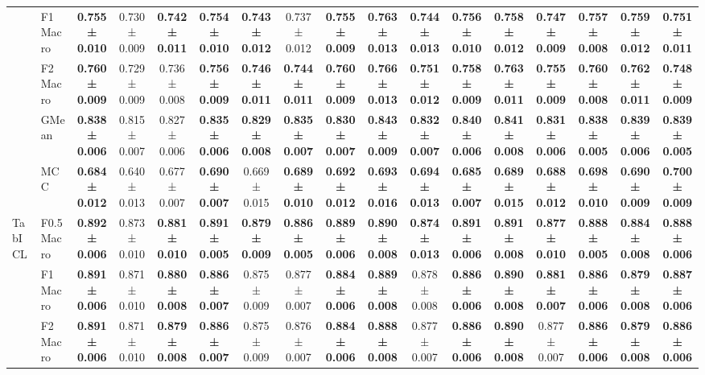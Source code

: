 \begin{table}[H]
{\begin{tabular}{llccccccccccccccc}
 & F1 Macro & \textbf{0.755 ± 0.010} & 0.730 ± 0.009 & \textbf{0.742 ± 0.011} & \textbf{0.754 ± 0.010} & \textbf{0.743 ± 0.012} & 0.737 ± 0.012 & \textbf{0.755 ± 0.009} & \textbf{0.763 ± 0.013} & \textbf{0.744 ± 0.013} & \textbf{0.756 ± 0.010} & \textbf{0.758 ± 0.012} & \textbf{0.747 ± 0.009} & \textbf{0.757 ± 0.008} & \textbf{0.759 ± 0.012} & \textbf{0.751 ± 0.011} \\
 & F2 Macro & \textbf{0.760 ± 0.009} & 0.729 ± 0.009 & 0.736 ± 0.008 & \textbf{0.756 ± 0.009} & \textbf{0.746 ± 0.011} & \textbf{0.744 ± 0.011} & \textbf{0.760 ± 0.009} & \textbf{0.766 ± 0.013} & \textbf{0.751 ± 0.012} & \textbf{0.758 ± 0.009} & \textbf{0.763 ± 0.011} & \textbf{0.755 ± 0.009} & \textbf{0.760 ± 0.008} & \textbf{0.762 ± 0.011} & \textbf{0.748 ± 0.009} \\
 & GMean & \textbf{0.838 ± 0.006} & 0.815 ± 0.007 & 0.827 ± 0.006 & \textbf{0.835 ± 0.006} & \textbf{0.829 ± 0.008} & \textbf{0.835 ± 0.007} & \textbf{0.830 ± 0.007} & \textbf{0.843 ± 0.009} & \textbf{0.832 ± 0.007} & \textbf{0.840 ± 0.006} & \textbf{0.841 ± 0.008} & \textbf{0.831 ± 0.006} & \textbf{0.838 ± 0.005} & \textbf{0.839 ± 0.006} & \textbf{0.839 ± 0.005} \\
 & MCC & \textbf{0.684 ± 0.012} & 0.640 ± 0.013 & 0.677 ± 0.007 & \textbf{0.690 ± 0.007} & 0.669 ± 0.015 & \textbf{0.689 ± 0.010} & \textbf{0.692 ± 0.012} & \textbf{0.693 ± 0.016} & \textbf{0.694 ± 0.013} & \textbf{0.685 ± 0.007} & \textbf{0.689 ± 0.015} & \textbf{0.688 ± 0.012} & \textbf{0.698 ± 0.010} & \textbf{0.690 ± 0.009} & \textbf{0.700 ± 0.009} \\
\cline{1-17}
\multirow[t]{5}{*}{TabICL} & F0.5 Macro & \textbf{0.892 ± 0.006} & 0.873 ± 0.010 & \textbf{0.881 ± 0.010} & \textbf{0.891 ± 0.005} & \textbf{0.879 ± 0.009} & \textbf{0.886 ± 0.005} & \textbf{0.889 ± 0.006} & \textbf{0.890 ± 0.008} & \textbf{0.874 ± 0.013} & \textbf{0.891 ± 0.006} & \textbf{0.891 ± 0.008} & \textbf{0.877 ± 0.010} & \textbf{0.888 ± 0.005} & \textbf{0.884 ± 0.008} & \textbf{0.888 ± 0.006} \\
 & F1 Macro & \textbf{0.891 ± 0.006} & 0.871 ± 0.010 & \textbf{0.880 ± 0.008} & \textbf{0.886 ± 0.007} & 0.875 ± 0.009 & 0.877 ± 0.007 & \textbf{0.884 ± 0.006} & \textbf{0.889 ± 0.008} & 0.878 ± 0.008 & \textbf{0.886 ± 0.006} & \textbf{0.890 ± 0.008} & \textbf{0.881 ± 0.007} & \textbf{0.886 ± 0.006} & \textbf{0.879 ± 0.008} & \textbf{0.887 ± 0.006} \\
 & F2 Macro & \textbf{0.891 ± 0.006} & 0.871 ± 0.010 & \textbf{0.879 ± 0.008} & \textbf{0.886 ± 0.007} & 0.875 ± 0.009 & 0.876 ± 0.007 & \textbf{0.884 ± 0.006} & \textbf{0.888 ± 0.008} & 0.877 ± 0.007 & \textbf{0.886 ± 0.006} & \textbf{0.890 ± 0.008} & 0.877 ± 0.007 & \textbf{0.886 ± 0.006} & \textbf{0.879 ± 0.008} & \textbf{0.886 ± 0.006} \\

\end{tabular}}
\end{table}
